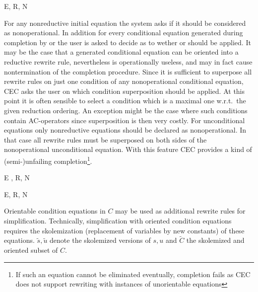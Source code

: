 \begin{CRule}
{ E, R, N \cup {} } 
\end{CRule}

\noindent
For any nonreductive initial equation the system asks if it should be
considered as nonoperational. In addition for every conditional equation generated during
completion by  or  the user is asked to decide as to 
wether  or  should be applied. It may be the case 
that a generated conditional equation can be oriented into a reductive rewrite rule, 
nevertheless is operationally useless, and may in fact cause nontermination 
of the completion procedure.
Since it is sufficient to superpose all rewrite rules on just one condition of any
nonoperational conditional equation, CEC asks the user on which condition superposition should be 
applied. At this point it is often sensible to select a condition which is a 
maximal one w.r.t.\ the given reduction ordering. An exception might be the case
where such conditions contain AC-operators since superposition is then very 
costly. 
For unconditional equations only nonreductive equations should be
declared as nonoperational. In that case all rewrite rules must be superposed
on both sides of the nonoperational unconditional equation. With this feature
CEC provides a kind of (semi-)unfailing completion\footnote[1]{If such an equation cannot be eliminated eventually,
completion fails as CEC does not support rewriting with 
instances of unorientable equations}. \bigskip

\begin{CRule}
{ E \cup {}, R, N }
\end{CRule}

\begin{CRule}
{ E, R, N \cup {} } 
\end{CRule}

\noindent Orientable condition equations in $C$ may 
be used as additional rewrite rules for simplification. Technically, simplification
with oriented condition equations requires the skolemization (replacement of
variables by new constants) of these 
equations. 
$\tilde{s}, \tilde{u}$ denote the skolemized versions of $ s, u $ and
$\tilde{C} $ the skolemized and oriented subset of $C$.\bigskip

